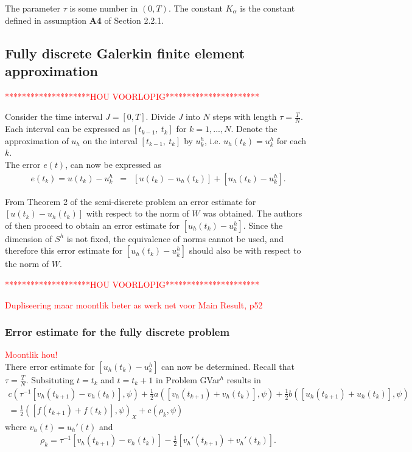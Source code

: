 \documentclass[../../main.tex]{subfiles}
\begin{document}
The parameter $\tau$ is some number in $(0,T)$. The constant $K_\alpha$ is the
constant defined in assumption \textbf{A4} of Section 2.2.1.

\subsection{Fully discrete Galerkin finite element approximation}
\textcolor{red}{********************HOU VOORLOPIG**********************}

Consider the time interval $J = [0,T]$. Divide $J$ into $N$ steps with length
$\tau = \frac{T}{N}$. Each interval can be expressed as $[t_{k-1}, \ t_k]$ for
$k = 1,...,N$. Denote the approximation of $u_h$ on the interval $[t_{k-1}, \
			t_k]$ by $u_k^h$, i.e. $u_h(t_k) = u_k^h$ for each $k$.\\


The error $e(t)$, can now be expressed as
\begin{eqnarray}
	e(t_k) = u(t_k) - u^h_k & = & [u(t_k)-u_h(t_k)] + [u_h(t_k) - u^h_k]. \label{error_ek}
\end{eqnarray}

From Theorem 2 of the semi-discrete problem an error estimate for
$[u(t_k)-u_h(t_k)]$ with respect to the norm of $W$ was obtained. The authors
of \cite{BV13} then proceed to obtain an error estimate for $[u_h(t_k) -
			u^h_k]$. Since the dimension of $S^h$ is not fixed, the equivalence of norms
cannot be used, and therefore this error estimate for $[u_h(t_k) - u^h_k]$
should also be with respect to the norm of $W$.

\textcolor{red}{********************HOU VOORLOPIG**********************}

\textcolor{red}{Dupliseering maar moontlik beter as werk net voor Main Result, p52}

\subsubsection{Error estimate for the fully discrete problem}

\textcolor{red}{Moontlik hou!}\\
There error estimate for $[u_h(t_k) - u^h_k]$ can now be determined. Recall that $\tau = \frac{T}{N}$. Subsituting $t = t_k$ and $t = t_k+1$ in Problem GVar$^h$ results in
\begin{eqnarray*}
	c( \tau^{-1}[v_{h}(t_{k+1})-v_{h}(t_{k})], \psi)+\frac{1}{2}a([v_{h}(t_{k+1})+v_{h}(t_{k})], \psi)+\frac{1}{2}b([u_{h}(t_{k+1})+u_{h}(t_{k})], \psi) \\
	=\frac{1}{2}([f(t_{k+1})+f(t_{k})], \psi)_{X}+c(\rho_{k}, \psi)
\end{eqnarray*}
where $v_{h}(t)=u_{h}'(t)$ and
\begin{eqnarray*}
	\rho_{k}=\tau^{-1}[v_{h}(t_{k+1})-v_{h}(t_{k})]-\frac{1}{2}[v_{h}'(t_{k+1})+v_{h}'(t_{k})].
\end{eqnarray*}
\end{document}
